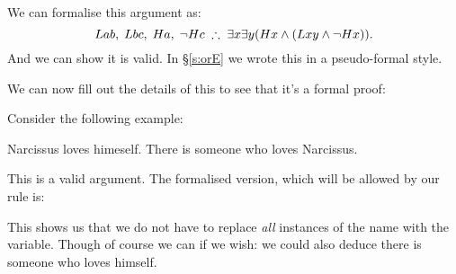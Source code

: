 We can formalise this argument as: $$Lab,\;Lbc,\;Ha,\;\enot Hc\;\therefore\;\exists x\exists y(Hx\eand (Lxy\eand\enot Hx)).$$ And we can show it is valid. In \S\ref{s:orE} we wrote this in a pseudo-formal style.
\begin{pf}
	\LEM
	\open
	\close
	\open
	\close
\end{pf}

We can now fill out the details of this to see that it's a formal proof:
\begin{pf}
	\LEM
	\open
	\close
	\open
	\close
\end{pf}

\bigskip
Consider the following example:
\begin{earg}
\prem Narcissus loves himeself.
\conc There is someone who loves Narcissus.
\end{earg}This is a valid argument. The formalised version, which will be allowed by our rule is:
\begin{pf}
	 
\end{pf} This shows us that we do not have to replace \emph{all} instances of the name with the variable. Though of course we can if we wish: we could also deduce there is someone who loves himself.

